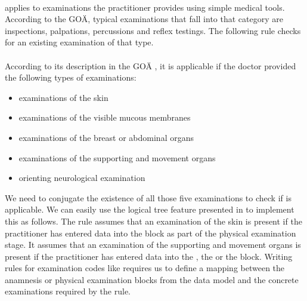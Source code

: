 \paragraph{}
 applies to examinations the practitioner provides using simple medical tools.
According to the GOÄ, typical examinations that fall into that category are inspections, palpations, percussions and reflex testings.
The following rule checks for an existing examination of that type.



\paragraph{}
According to its description in the GOÄ \cite{hermanns2015ebm}, it is applicable if the doctor provided the following types of examinations:
\begin{itemize}
    \item examinations of the skin
    \item examinations of the visible mucous membranes
    \item examinations of the breast or abdominal organs
    \item examinations of the supporting and movement organs
    \item orienting neurological examination
\end{itemize}
We need to conjugate the existence of all those five examinations to check if  is applicable.
We can easily use the logical tree feature presented in \addref to implement this as follows.
The rule assumes that an examination of the skin is present if the practitioner has entered data into the  block as part of the physical examination stage.
It assumes that an examination of the supporting and movement organs is present if the practitioner has entered data into the , the  or the  block.
Writing rules for examination codes like  requires us to define a mapping between the anamnesis or physical examination blocks from the \AV data model and the concrete examinations required by the rule.

